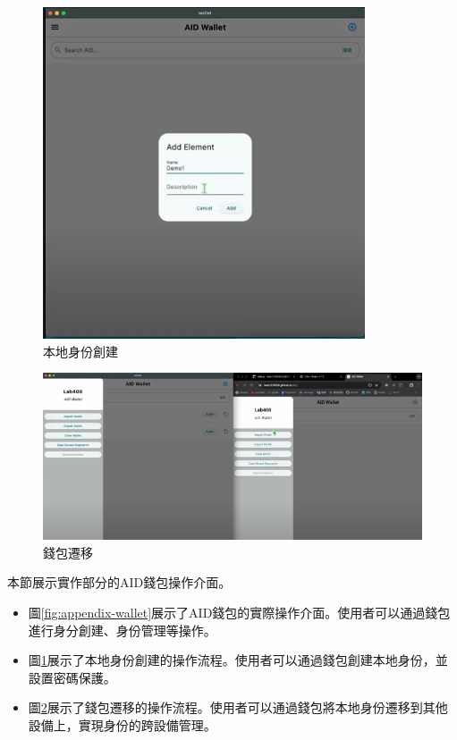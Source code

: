 \begin{figure}[p]
  \centering
  \includegraphics[width=\linewidth]{figures/wallet-create-demo.png}
  \caption{本地身份創建}
  \label{fig:appendix-wallet-create-demo}
\end{figure}
\clearpage
\begin{figure}[p]
  \centering
  \includegraphics[width=\linewidth]{figures/wallet-drawer-demo.png}
  \caption{錢包遷移}
  \label{fig:appendix-wallet-drawer-demo}
\end{figure}
本節展示實作部分的AID錢包操作介面。
\begin{itemize}
  \item 圖\ref{fig:appendix-wallet}展示了AID錢包的實際操作介面。使用者可以通過錢包進行身分創建、身份管理等操作。
  \item 圖\ref{fig:appendix-wallet-create-demo}展示了本地身份創建的操作流程。使用者可以通過錢包創建本地身份，並設置密碼保護。
  \item 圖\ref{fig:appendix-wallet-drawer-demo}展示了錢包遷移的操作流程。使用者可以通過錢包將本地身份遷移到其他設備上，實現身份的跨設備管理。
\end{itemize}
